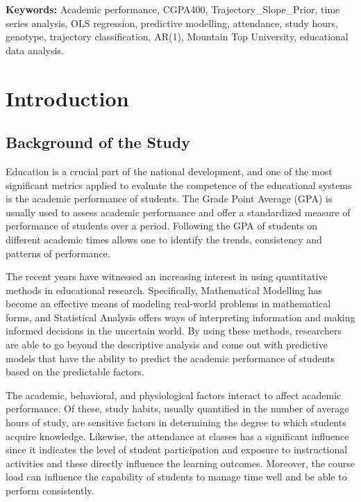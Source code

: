 \documentclass[12pt]{report}
\begin{document}
	\vspace{1em}
	\noindent \textbf{Keywords:} Academic performance, CGPA400, Trajectory\_Slope\_Prior, time series analysis, OLS regression, predictive modelling, attendance, study hours, genotype, trajectory classification, AR(1), Mountain Top University, educational data analysis.

	\newpage
	\tableofcontents
	\listoffigures
	\newpage

	\chapter{Introduction}
	
	\section{Background of the Study}
	
	Education is a crucial part of the national development, and one of the most significant metrics applied to evaluate the competence of the educational systems is the academic performance of students. The Grade Point Average (GPA) is usually used to assess academic performance and offer a standardized measure of performance of students over a period. Following the GPA of students on different academic times allows one to identify the trends, consistency and patterns of performance.
	
	The recent years have witnessed an increasing interest in using quantitative methods in educational research. Specifically, Mathematical Modelling has become an effective means of modeling real-world problems in mathematical forms, and Statistical Analysis offers ways of interpreting information and making informed decisions in the uncertain world. By using these methods, researchers are able to go beyond the descriptive analysis and come out with predictive models that have the ability to predict the academic performance of students based on the predictable factors.
	
	The academic, behavioral, and physiological factors interact to affect academic performance. Of these, study habits, usually quantified in the number of average hours of study, are sensitive factors in determining the degree to which students acquire knowledge. Likewise, the attendance at classes has a significant influence since it indicates the level of student participation and exposure to instructional activities and these directly influence the learning outcomes. Moreover, the course load can influence the capability of students to manage time well and be able to perform consistently.
	
\end{document}
